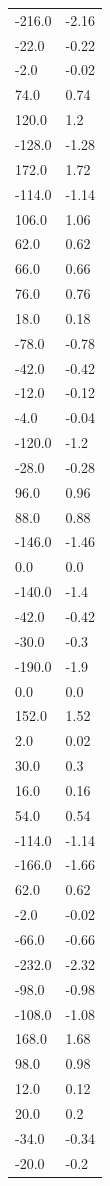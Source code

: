 \begin{longtable}{ll}
-216.0 & -2.16 \\
-22.0 & -0.22 \\
-2.0 & -0.02 \\
74.0 & 0.74 \\
120.0 & 1.2 \\
-128.0 & -1.28 \\
172.0 & 1.72 \\
-114.0 & -1.14 \\
106.0 & 1.06 \\
62.0 & 0.62 \\
66.0 & 0.66 \\
76.0 & 0.76 \\
18.0 & 0.18 \\
-78.0 & -0.78 \\
-42.0 & -0.42 \\
-12.0 & -0.12 \\
-4.0 & -0.04 \\
-120.0 & -1.2 \\
-28.0 & -0.28 \\
96.0 & 0.96 \\
88.0 & 0.88 \\
-146.0 & -1.46 \\
0.0 & 0.0 \\
-140.0 & -1.4 \\
-42.0 & -0.42 \\
-30.0 & -0.3 \\
-190.0 & -1.9 \\
0.0 & 0.0 \\
152.0 & 1.52 \\
2.0 & 0.02 \\
30.0 & 0.3 \\
16.0 & 0.16 \\
54.0 & 0.54 \\
-114.0 & -1.14 \\
-166.0 & -1.66 \\
62.0 & 0.62 \\
-2.0 & -0.02 \\
-66.0 & -0.66 \\
-232.0 & -2.32 \\
-98.0 & -0.98 \\
-108.0 & -1.08 \\
168.0 & 1.68 \\
98.0 & 0.98 \\
12.0 & 0.12 \\
20.0 & 0.2 \\
-34.0 & -0.34 \\
-20.0 & -0.2 \\

\end{longtable}
